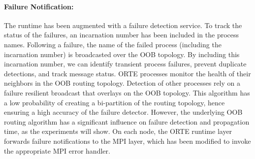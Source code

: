 \paragraph*{Failure Notification:} The runtime has been augmented with a
failure detection service. To track the status of the failures, an
incarnation number has been included in the process names. Following a
failure, the name of the failed process (including the incarnation
number) is broadcasted over the OOB topology. By including this
incarnation number, we can identify transient process failures, prevent
duplicate detections, and track message status. ORTE processes monitor
the health of their neighbors in the OOB routing topology. Detection of
other processes rely on a failure resilient broadcast that overlays on
the OOB topology. This algorithm has a low probability of creating a
bi-partition of the routing topology, hence ensuring a high accuracy of
the failure detector. However, the underlying OOB routing algorithm has
a significant influence on failure detection and propagation time, as
the experiments will show. On each node, the ORTE runtime layer forwards
failure notifications to the MPI layer, which has been modified to
invoke the appropriate MPI error handler.
